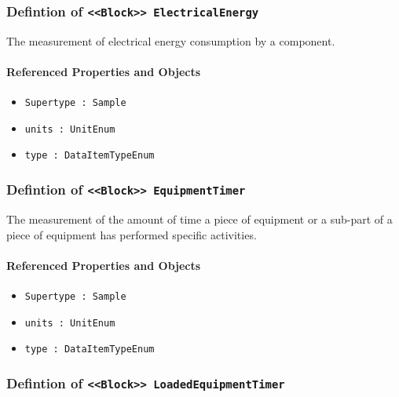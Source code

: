 \subsubsection{Defintion of \texttt{<<Block>> ElectricalEnergy}}
  \label{type:ElectricalEnergy}

\FloatBarrier

The measurement of electrical energy consumption by a component.

\FloatBarrier
\paragraph{Referenced Properties and Objects}

\begin{itemize}
\item \texttt{Supertype : Sample}

\item \texttt{units : UnitEnum}

\item \texttt{type : DataItemTypeEnum}

\end{itemize}
\FloatBarrier
\subsubsection{Defintion of \texttt{<<Block>> EquipmentTimer}}
  \label{type:EquipmentTimer}

\FloatBarrier

The measurement of the amount of time a piece of equipment or a sub-part of a piece of equipment has performed specific activities.

\FloatBarrier
\paragraph{Referenced Properties and Objects}

\begin{itemize}
\item \texttt{Supertype : Sample}

\item \texttt{units : UnitEnum}

\item \texttt{type : DataItemTypeEnum}

\end{itemize}
\FloatBarrier
\subsubsection{Defintion of \texttt{<<Block>> LoadedEquipmentTimer}}
  \label{type:LoadedEquipmentTimer}

